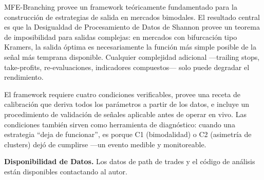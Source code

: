 \documentclass[11pt,a4paper]{article}
\begin{document}
MFE-Branching provee un framework teóricamente fundamentado para la construcción de estrategias de salida en mercados bimodales. El resultado central es que la Desigualdad de Procesamiento de Datos de Shannon provee un teorema de imposibilidad para salidas complejas: en mercados con bifurcación tipo Kramers, la salida óptima es necesariamente la función más simple posible de la señal más temprana disponible. Cualquier complejidad adicional ---trailing stops, take-profits, re-evaluaciones, indicadores compuestos--- solo puede degradar el rendimiento.

El framework requiere cuatro condiciones verificables, provee una receta de calibración que deriva todos los parámetros a partir de los datos, e incluye un procedimiento de validación de señales aplicable antes de operar en vivo. Las condiciones también sirven como herramienta de diagnóstico: cuando una estrategia ``deja de funcionar'', es porque C1 (bimodalidad) o C2 (asimetría de clusters) dejó de cumplirse ---un evento medible y monitoreable.

\vspace{1cm}
\noindent\textbf{Disponibilidad de Datos.} Los datos de path de trades y el código de análisis están disponibles contactando al autor.
\end{document}
